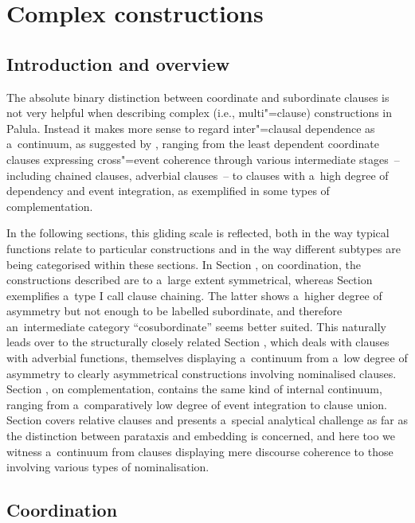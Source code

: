 \chapter{Complex constructions}
\label{chap:13}

\section{Introduction and overview}
\label{sec:13-1}


The absolute binary distinction between coordinate and subordinate clauses is not very helpful when describing complex (i.e., multi"=clause) constructions in Palula. Instead it makes more sense to regard inter"=clausal dependence as a~continuum, as suggested by \citet[327--328]{givon2001b}, ranging from the least dependent coordinate clauses expressing cross"=event coherence through various intermediate stages~-- including chained clauses, adverbial clauses~-- to clauses with a~high degree of dependency and event integration, as exemplified in some types of complementation.



In the following sections, this gliding scale is reflected, both in the way typical functions relate to particular constructions and in the way different subtypes are being categorised within these sections. In Section , on coordination, the constructions described are to a~large extent symmetrical, whereas Section  exemplifies a~type I call clause chaining. The latter shows a~higher degree of asymmetry but not enough to be labelled subordinate, and therefore an~intermediate category ``cosubordinate'' seems better suited. This naturally leads over to the structurally closely related Section , which deals with clauses with adverbial functions, themselves displaying a~continuum from a~low degree of asymmetry to clearly asymmetrical constructions involving nominalised clauses. Section , on complementation, contains the same kind of internal continuum, ranging from a~comparatively low degree of event integration to clause union. Section  covers relative clauses and presents a~special analytical challenge as far as the distinction between parataxis and embedding is concerned, and here too we witness a~continuum from clauses displaying mere discourse coherence to those involving various types of nominalisation.


\section{Coordination}
\label{sec:13-2}

